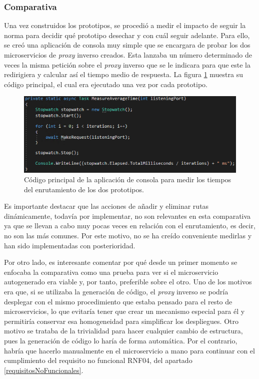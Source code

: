 \documentclass[11pt,spanish,listoffigures]{tfgetsinf}
\begin{document}
			\subsubsection{Comparativa}

Una vez construidos los prototipos, se procedió a medir el impacto de seguir la norma para decidir qué prototipo desechar y con cuál seguir adelante. Para ello, se creó una aplicación de consola muy simple que se encargara de probar los dos microservicios de \emph{proxy} inverso creados. Esta lanzaba un número determinado de veces la misma petición sobre el \emph{proxy} inverso que se le indicara para que este la redirigiera y calcular así el tiempo medio de respuesta. La figura \ref{medidorTiempos} muestra su código principal, el cual era ejecutado una vez por cada prototipo.

\begin{figure}[ht]
\centering
\includegraphics[scale=1]{imagenes/medidorTiempos}
\caption{Código principal de la aplicación de consola para medir los tiempos del enrutamiento de los dos prototipos.}
	\label{medidorTiempos}
\end{figure}

Es importante destacar que las acciones de añadir y eliminar rutas dinámicamente, todavía por implementar, no son relevantes en esta comparativa ya que se llevan a cabo muy pocas veces en relación con el enrutamiento, es decir, no son las más comunes. Por este motivo, no se ha creído conveniente medirlas y han sido implementadas con posterioridad.

Por otro lado, es interesante comentar por qué desde un primer momento se enfocaba la comparativa como una prueba para ver si el microservicio autogenerado era viable y, por tanto, preferible sobre el otro. Uno de los motivos era que, si se utilizaba la generación de código, el \emph{proxy} inverso se podría desplegar con el mismo procedimiento que estaba pensado para el resto de microservicios, lo que evitaría tener que crear un mecanismo especial para él y permitiría conservar esa homogeneidad para simplificar los despliegues. Otro motivo se trataba de la trivialidad para hacer cualquier cambio de estructura, pues la generación de código lo haría de forma automática. Por el contrario, habría que hacerlo manualmente en el microservicio a mano para continuar con el cumplimiento del requisito no funcional RNF04, del apartado \ref{requisitosNoFuncionales}.
\end{document}
